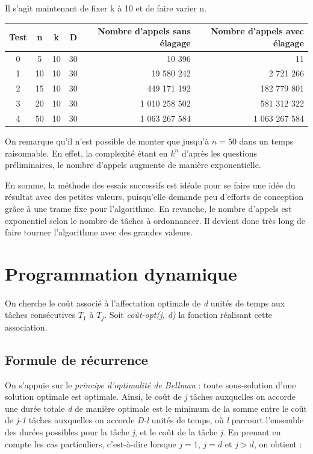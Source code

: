 \documentclass[a4paper, titlepage]{article}
\begin{document}
	Il s'agit maintenant de fixer k à 10 et de faire varier n.

	\begin{center}
		\begin{tabular}{|c|c|c|c|r|r|}
			\hline
			Test	& n	& k	& D	& Nombre d'appels sans élagage & Nombre d'appels avec élagage \\
			\hline
			0 	& 5	& 10	& 30	& 10 396 	& 11 \\ \hline
			1 	& 10	& 10	& 30	& 19 580 242 	& 2 721 266 \\ \hline
			2 	& 15	& 10	& 30	& 449 171 192 	& 182 779 801 \\ \hline
			3 	& 20	& 10	& 30	& 1 010 258 502 	& 581 312 322 \\ \hline
			4 	& 50	& 10	& 30	& 1 063 267 584 	& 1 063 267 584 \\
			\hline
		\end{tabular}
	\end{center}
	
	On remarque qu'il n'est possible de monter que jusqu'à $n = 50$ dans un temps raisonnable.
	En effet, la complexité étant en $k^n$ d'après les questions préliminaires, le nombre d'appels augmente de manière exponentielle.
	
	En somme, la méthode des essais successifs est idéale pour se faire une idée du résultat avec des petites valeurs, puisqu'elle demande peu d'efforts de conception grâce à une trame fixe pour l'algorithme.
	En revanche, le nombre d'appels est exponentiel selon le nombre de tâches à ordonnancer.
	Il devient donc très long de faire tourner l'algorithme avec des grandes valeurs.

\section{Programmation dynamique}
	\paragraph{}
		On cherche le coût associé à l'affectation optimale de \emph{d} unités de temps aux tâches consécutives $T_{1}$ à $T_{j}$. Soit \emph{coût-opt(j, d)} la fonction réalisant cette association.

	\subsection{Formule de récurrence}
		On s'appuie sur le \emph{principe d'optimalité de Bellman} : toute sous-solution d'une solution optimale est optimale.
		Ainsi, le coût de \emph{j} tâches auxquelles on accorde une durée totale \emph{d} de manière optimale est le minimum de la somme entre le coût de \emph{j-1} tâches auxquelles on accorde \emph{D-l} unités de temps, où \emph{l} parcourt l'ensemble des durées possibles pour la tâche \emph{j}, et le coût de la tâche \emph{j}.
		En prenant en compte les cas particuliers, c'est-à-dire lorsque $j = 1$, $j = d$ et $j > d$, on obtient :
		
\end{document}
